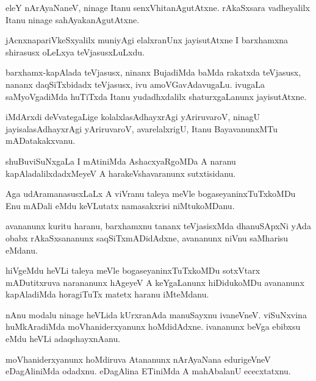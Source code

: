 \documentclass{article}
\begin{document}
\begin{mn}
eleY nArAyaNaneV, ninage Itanu senxVhitanAgutAtxne. rAkaSxsara
vadheyalilx Itanu ninage sahAyakanAgutAtxne.
\end{mn}

\begin{mn}
jAcnxnapariVkeSxyalilx muniyAgi elalxranUnx jayisutAtxne I barxhamxna
shirasusx oLeLxya teVjasusxLuLxdu.
\end{mn}

\begin{mn}
barxhamx-kapAlada teVjasusx, ninanx BujadiMda baMda rakatxda
teVjasusx, nananx daqSiTxbidadx teVjasusx, ivu
amoVGavAdavugaLu. ivugaLa saMyoVgadiMda huTiTxda Itanu yudadhxdalilx
shaturxgaLanunx jayisutAtxne.
\end{mn}

\begin{mn}
iMdArxdi deVvategaLige kolalxlasAdhayxrAgi yAriruvaroV, ninagU
jayisalasAdhayxrAgi yAriruvaroV, avarelalxrigU, Itanu BayavanunxMTu mADatakakxvanu.
\end{mn}

\begin{mn}
shuBuviSuNxgaLa I mAtiniMda AshacxyaRgoMDa A naranu
kapAladalilxdadxMeyeV A harakeVshavaranunx sutxtisidanu.
\end{mn}

\begin{mn}%
Aga udAramanasusxLaLx A viVranu taleya meVle bogaseyaninxTuTxkoMDu Enu
mADali eMdu keVLutatx namasakxrisi niMtukoMDanu.
\end{mn}

\begin{mn}
avananunx kuritu haranu, barxhamxnu tananx teVjasisxMda dhanuSApxNi
yAda obabx rAkaSxsananunx saqSiTxmADidAdxne, avananunx niVnu saMharisu eMdanu.
\end{mn}

\begin{mn}%
hiVgeMdu heVLi taleya meVle bogaseyaninxTuTxkoMDu sotxVtarx
mADutitxruva narananunx hAgeyeV A keYgaLanunx hiDidukoMDu avananunx
kapAladiMda horagiTuTx matetx haranu iMteMdanu.
\end{mn}

\begin{mn}%
nAnu modalu ninage heVLida kUrxranAda manuSayxnu ivaneVneV. viSuNxvina
huMkAradiMda moVhaniderxyanunx hoMdidAdxne. ivananunx beVga ebibxsu
eMdu heVLi adaqshayxnAanu.
\end{mn}

\begin{mn}
moVhaniderxyanunx hoMdiruva Atananunx nArAyaNana edurigeVneV
eDagAliniMda odadxnu. eDagAlina ETiniMda A mahAbalanU ececxtatxnu.
\end{mn}
\end{document}
